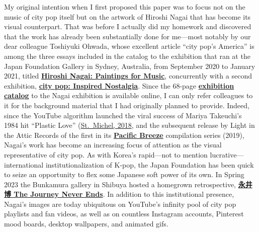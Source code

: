 \documentclass[
  letterpaper,
  DIV=11,
  numbers=noendperiod,
  oneside]{scrartcl}
\begin{document}
My original intention when I first proposed this paper was to focus not
on the music of city pop itself but on the artwork of Hiroshi Nagai that
has become its visual counterpart. That was before I actually did my
homework and discovered that the work has already been substantially
done for me---most notably by our dear colleague Toshiyuki Ohwada, whose
excellent article ``city pop's America'' is among the three essays
included in the catalog to the exhibition that ran at the Japan
Foundation Gallery in Sydney, Australia, from September 2020 to January
2021, titled
\href{https://sydney.jpf.go.jp/events/hiroshi-nagai-paintings-for-music/?fbclid=IwY2xjawI-ln5leHRuA2FlbQIxMAABHeUKRUj04Mc1iZN3DLiHTb9vlyObwcnLlw9RSAhx0Qs9AoYexaWgypC6bA_aem_H1QOj7XPApKfEvNOOAXjdA}{\textbf{Hiroshi
Nagai: Paintings for Music}}, concurrently with a second exhibition,
\href{https://sydney.jpf.go.jp/events/city-pop-inspired-nostalgia/}{\textbf{city
pop: Inspired Nostalgia}}. Since the 68-page
\href{https://sydney.jpf.go.jp/jpf/jpfmedia/JPF-HNCatalogue-R7-Issuu.pdf}{\textbf{exhibition
catalog}} to the Nagai exhibition is available online, I can only refer
colleagues to it for the background material that I had originally
planned to provide. Indeed, since the YouTube algorithm launched the
viral success of Mariya Takeuchi's 1984 hit ``Plastic Love''
(\href{https://www.japantimes.co.jp/culture/2018/11/17/music/mariya-takeuchi-pop-genius-behind-2018s-surprise-online-smash-hit-japan/}{St.~Michel,
2018}, and the subsequent release by Light in the Attic Records of the
first in its
\href{https://lightintheattic.net/collections/v-a-pacific-breeze/products/pacific-breeze-japanese-city-pop-aor-boogie-1976-1986}{\textbf{Pacific
Breeze}} compilation series (2019), Nagai's work has become an
increasing focus of attention as the visual representative of city pop.
As with Korea's rapid---not to mention lucrative--- international
institutionalization of K-pop, the Japan Foundation has been quick to
seize an opportunity to flex some Japanese soft power of its own. In
Spring 2023 the Bunkamura gallery in Shibuya hosted a homegrown
retrospective,
\href{https://www.bunkamura.co.jp/gallery/exhibition/230301nagai.html}{\textbf{永井博
The Journey Never Ends}}. In addition to this institutional presence,
Nagai's images are today ubiquitous on YouTube's infinity pool of city
pop playlists and fan videos, as well as on countless Instagram
accounts, Pinterest mood boards, desktop wallpapers, and animated gifs.
\end{document}
